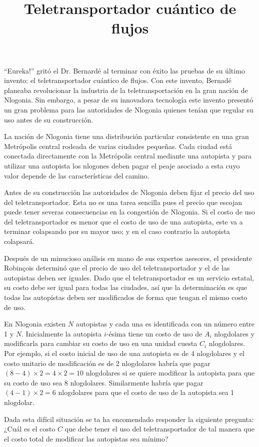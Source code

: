 \documentclass{oci}
\title{Teletransportador cuántico de flujos}
\begin{document}
\begin{problemDescription}
  ``Eureka!'' gritó el Dr. Bernardé al terminar con éxito las pruebas de su
  último invento: el teletransportador cuántico de flujos.
  Con este invento, Bernadé planeaba revolucionar la industria de la
  teletransportación en la gran nación de Nlogonia.
  Sin embargo, a pesar de su innovadora tecnología este invento presentó un gran
  problema para las autoridades de Nlogonia quienes tenían que regular su uso
  antes de su construcción.

  La nación de Nlogonia tiene una distribución particular consistente en una gran
  Metrópolis central rodeada de varias ciudades pequeñas.
  Cada ciudad está conectada directamente con la Metrópolis central mediante
  una autopista y para utilizar una autopista los nlogones deben pagar el peaje
  asociado a esta cuyo valor depende de las características del camino.

  Antes de su construcción las autoridades de Nlogonia deben fijar el precio del
  uso del teletransportador. 
  Esta no es una tarea sencilla pues el precio que escojan puede tener severas
  consecuencias en la congestión de Nlogonia.
  Si el costo de uso del teletransportador es menor que el costo de uso de una
  autopista, este va a terminar colapsando por su mayor uso; y en el caso
  contrario la autopista colapsará.

  Después de un minucioso análisis en mano de sus expertos asesores, el
  presidente Robinçois determinó que el precio de uso del teletransportador y el
  de las autopistas deben ser iguales.
  Dado que el teletransportador es un servicio estatal, su costo debe ser
  igual para todas las ciudades, así que la determinación es que todas las
  autopistas deben ser modificados de forma que tengan el mismo costo de uso.

  En Nlogonia existen $N$ autopistas y cada una es identificada con un número
  entre 1 y $N$.
  Inicialmente la autopista $i$-ésima tiene un costo de uso de $A_i$ nlogdolares
  y modificarla para cambiar su costo de uso en una unidad cuesta $C_i$
  nlogdolares.
  Por ejemplo, si el costo inicial de uso de una autopista es de 4 nlogdolares y
  el costo unitario de modificación es de 2 nlogdolares habría que pagar
  $(8-4)\times 2=4\times 2=10$ nlogdolares si se quiere modificar la autopista
  para que su costo de uso sea 8 nlogdolares.
  Similarmente habría que pagar $(4-1)\times 2=6$ nlogdolares para que el costo
  de uso de la autopista sea 1 nlogdolar.

  Dada esta difícil situación se ta ha encomendado responder la siguiente
  pregunta: ¿Cuál es el costo $C$ que debe tener el uso del teletransportador de
  tal manera que el costo total de modificar las autopistas sea mínimo?

\end{problemDescription}
\end{document}
